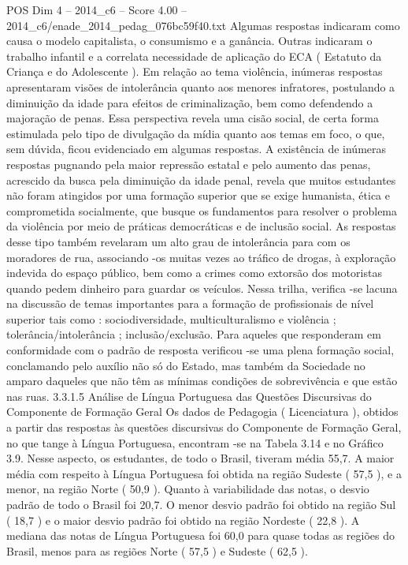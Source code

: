 \begin{textsample}{POS Dim 4 – 2014\_c6 – Score 4.00 – 2014\_c6/enade\_2014\_pedag\_076bc59f40.txt}
Algumas respostas indicaram como causa o modelo capitalista, o consumismo e a ganância.
Outras indicaram o trabalho infantil e a correlata necessidade de aplicação do ECA ( Estatuto da Criança e do Adolescente ).
Em relação ao tema violência, inúmeras respostas apresentaram visões de intolerância quanto aos menores infratores, postulando a diminuição da idade para efeitos de criminalização, bem como defendendo a majoração de penas.
Essa perspectiva revela uma cisão social, de certa forma estimulada pelo tipo de divulgação da mídia quanto aos temas em foco, o que, sem dúvida, ficou evidenciado em algumas respostas.
A existência de inúmeras respostas pugnando pela maior repressão estatal e pelo aumento das penas, acrescido da busca pela diminuição da idade penal, revela que muitos estudantes não foram atingidos por uma formação superior que se exige humanista, ética e comprometida socialmente, que busque os fundamentos para resolver o problema da violência por meio de práticas democráticas e de inclusão social.
As respostas desse tipo também revelaram um alto grau de intolerância para com os moradores de rua, associando -os muitas vezes ao tráfico de drogas, à exploração indevida do espaço público, bem como a crimes como extorsão dos motoristas quando pedem dinheiro para guardar os veículos.
Nessa trilha, verifica -se lacuna na discussão de temas importantes para a formação de profissionais de nível superior tais como : sociodiversidade, multiculturalismo e violência ; tolerância/intolerância ; inclusão/exclusão.
Para aqueles que responderam em conformidade com o padrão de resposta verificou -se uma plena formação social, conclamando pelo auxílio não só do Estado, mas também da Sociedade no amparo daqueles que não têm as mínimas condições de sobrevivência e que estão nas ruas. 3.3.1.5 Análise de Língua Portuguesa das Questões Discursivas do Componente de Formação Geral Os dados de Pedagogia ( Licenciatura ), obtidos a partir das respostas às questões discursivas do Componente de Formação Geral, no que tange à Língua Portuguesa, encontram -se na Tabela 3.14 e no Gráfico 3.9.
Nesse aspecto, os estudantes, de todo o Brasil, tiveram média 55,7.
A maior média com respeito à Língua Portuguesa foi obtida na região Sudeste ( 57,5 ), e a menor, na região Norte ( 50,9 ).
Quanto à variabilidade das notas, o desvio padrão de todo o Brasil foi 20,7.
O menor desvio padrão foi obtido na região Sul ( 18,7 ) e o maior desvio padrão foi obtido na região Nordeste ( 22,8 ).
A mediana das notas de Língua Portuguesa foi 60,0 para quase todas as regiões do Brasil, menos para as regiões Norte ( 57,5 ) e Sudeste ( 62,5 ).

\end{textsample}
